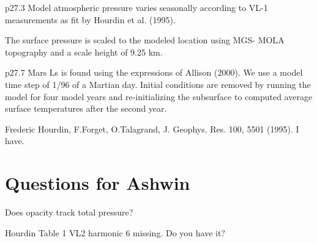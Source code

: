 \documentclass{article}
\begin{document}
p27.3 Model atmospheric pressure varies seasonally according to VL-1
measurements as fit by Hourdin et al. (1995).

The surface pressure is scaled to the modeled location using MGS- MOLA
topography and a scale height of 9.25 km.

p27.7 Mars Ls is found using the expressions of Allison (2000).  We use a model
time step of 1/96 of a Martian day.  Initial conditions are removed by running
the model for four model years and re-initializing the subsurface to computed
average surface temperatures after the second year.

Frederic Hourdin, F.Forget,  O.Talagrand,  J. Geophys. Res. 100, 5501 (1995). 
\qi  I have.

\section{Questions for Ashwin}

Does opacity track total pressure?

Hourdin Table 1 VL2 harmonic 6 missing. Do you have it?


 
\end{document}
